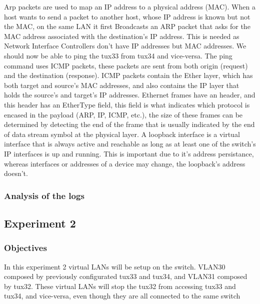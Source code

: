 \documentclass[a4paper,11pt,english]{article}
\begin{document}
            Arp  packets are used to map an IP address to 
            a physical address (MAC). When a host wants to send a packet to another host, whose 
            IP address is known but not the MAC, on the same LAN it first Broadcasts an ARP packet 
            that asks for the MAC address associated with the destination's IP address. 
            This is needed as Network Interface Controllers don't have IP addresses but 
            MAC addresses. We should now be able to ping the tux33 from tux34 and vice-versa.
            The ping command uses ICMP packets, these packets are sent from both origin (request) 
            and the destination (response). ICMP packets contain the Ether layer, which has both
            target and source's MAC addresses, and also contains the IP layer that holds the
            source's and target's IP addresses. 
            Ethernet frames have an header, and this header has an EtherType field, this field
            is what indicates which protocol is encased in the payload (ARP, IP, ICMP, etc.), 
            the size of these frames can be determined by detecting the end of the frame that
            is usually indicated by the end of data stream symbol at the physical layer.
            A loopback interface is a virtual interface that is always active and reachable as 
            long as at least one of the switch's IP interfaces is up and running. This is important 
            due to it's address persistance, whereas interfaces or addresses of a device may change, 
            the loopback's address doesn't.

            
        \subsubsection{Analysis of the logs}
            
            



    \subsection{Experiment 2}
        \subsubsection{Objectives}
            In this experiment 2 virtual LANs will be setup on the switch. 
            VLAN30 composed by previously configurated tux33 and tux34, and VLAN31 composed
            by tux32. These virtual LANs will stop the tux32 from accessing tux33 and tux34,
            and vice-versa, even though they are all connected to the same switch
            
\end{document}
